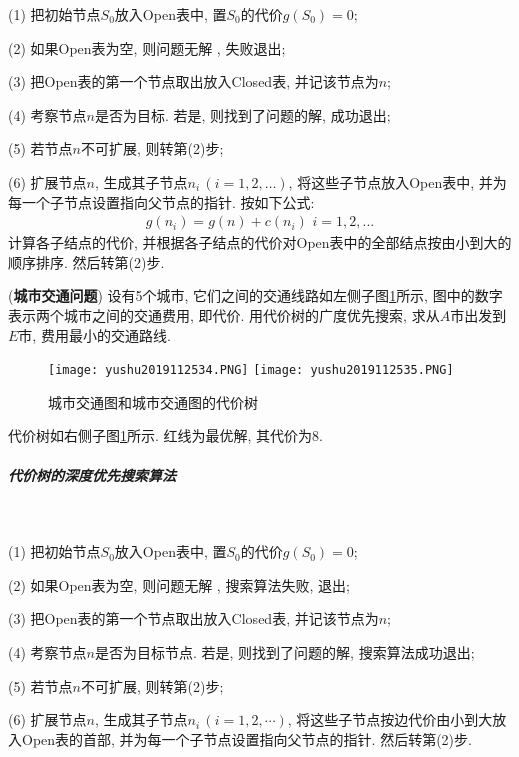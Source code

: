(1) 把初始节点$S_0$放入Open表中, 置$S_0$的代价$g(S_0)=0$;

(2) 如果Open表为空, 则问题无解 , 失败退出;

(3) 把Open表的第一个节点取出放入Closed表, 并记该节点为$n$;

(4) 考察节点$n$是否为目标. 若是, 则找到了问题的解, 成功退出;

(5) 若节点$n$不可扩展, 则转第(2)步;

(6) 扩展节点$n$, 生成其子节点$n_i\,(i=1, 2, …)$, 将这些子节点放入Open表中, 并为每一个子节点设置指向父节点的指针. 按如下公式:
\begin{align}
  g(n_i)=g(n)+c(n_i)\,\,i=1,2,...
\end{align}
计算各子结点的代价, 并根据各子结点的代价对Open表中的全部结点按由小到大的顺序排序. 然后转第(2)步.
\begin{example}
(\textbf{城市交通问题}) 设有5个城市, 它们之间的交通线路如左侧子图\ref{AI32fig2019120234}所示, 图中的数字表示两个城市之间的交通费用, 即代价. 用代价树的广度优先搜索, 求从$A$市出发到$E$市, 费用最小的交通路线.
\end{example}
\begin{result}
\begin{figure}[H]
\centering
\texttt{[image: yushu2019112534.PNG]}
\texttt{[image: yushu2019112535.PNG]}
\caption{城市交通图和城市交通图的代价树 }
\label{AI32fig2019120234}
\end{figure}
代价树如右侧子图\ref{AI32fig2019120234}所示. 红线为最优解, 其代价为8.
\subparagraph{代价树的深度优先搜索算法}~{}

(1) 把初始节点$S_0$放入Open表中, 置$S_0$的代价$g(S_0)=0$;

(2) 如果Open表为空, 则问题无解 , 搜索算法失败, 退出;

(3) 把Open表的第一个节点取出放入Closed表, 并记该节点为$n$;

(4) 考察节点$n$是否为目标节点. 若是, 则找到了问题的解, 搜索算法成功退出;

(5) 若节点$n$不可扩展, 则转第(2)步;

(6) 扩展节点$n$, 生成其子节点$n_i\,(i=1, 2,\cdots)$, 将这些子节点按边代价由小到大放入Open表的首部, 并为每一个子节点设置指向父节点的指针. 然后转第(2)步.

\end{result}
